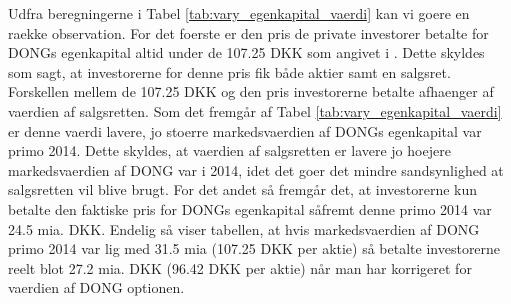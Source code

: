 \documentclass{article}
\begin{document}
Udfra beregningerne i Tabel \ref{tab:vary_egenkapital_vaerdi} kan vi goere en raekke observation. For det foerste er den pris de private investorer betalte for DONGs egenkapital altid under de 107.25 DKK som angivet i \citep{FM2013a}. Dette skyldes som sagt, at investorerne for denne pris fik både aktier samt en salgsret. Forskellen mellem de 107.25 DKK og den pris investorerne betalte afhaenger af vaerdien af salgsretten. Som det fremgår af Tabel \ref{tab:vary_egenkapital_vaerdi} er denne vaerdi lavere, jo stoerre markedsvaerdien af DONGs egenkapital var primo 2014. Dette skyldes, at vaerdien af salgsretten er lavere jo hoejere markedsvaerdien af DONG var i 2014, idet det goer det mindre sandsynlighed at salgsretten vil blive brugt. For det andet så fremgår det, at investorerne kun betalte den faktiske pris for DONGs egenkapital såfremt denne primo 2014 var 24.5 mia. DKK. Endelig så viser tabellen, at hvis markedsvaerdien af DONG primo 2014 var lig med 31.5 mia (107.25 DKK per aktie) så betalte investorerne reelt blot 27.2 mia. DKK (96.42 DKK per aktie) når man har korrigeret for vaerdien af DONG optionen.
\end{document}
